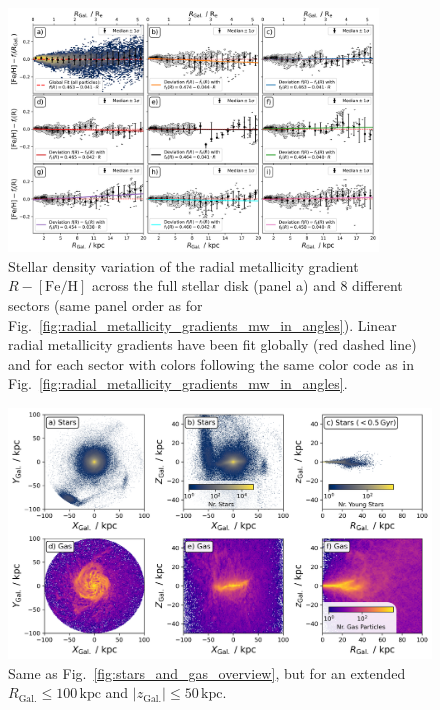 \documentclass[fleqn,usenatbib]{mnras}
\begin{document}
\begin{figure}
    \centering
    \includegraphics[width=0.875\textwidth]{figures/linear_radial_metallicity_gradients_mw_in_angles.png}
    \caption{Stellar density variation of the radial metallicity gradient $R-\mathrm{[Fe/H]}$ across the full stellar disk (panel a) and 8 different sectors (same panel order as for Fig.~\ref{fig:radial_metallicity_gradients_mw_in_angles}). Linear radial metallicity gradients have been fit globally (red dashed line) and for each sector with colors following the same color code as in Fig.~\ref{fig:radial_metallicity_gradients_mw_in_angles}.}    \label{fig:linear_radial_metallicity_gradients_mw_in_angles}
\end{figure}

\begin{figure}
    \centering
    \includegraphics[width=\textwidth]{figures/stars_and_gas_overview_100kpc.png}
    \caption{Same as Fig.~\ref{fig:stars_and_gas_overview}, but for an extended $R_\mathrm{Gal.} \leq 100\,\mathrm{kpc}$ and $\vert z_\mathrm{Gal.} \vert \leq 50\,\mathrm{kpc}$.}
    \label{fig:stars_and_gas_overview_100kpc}
\end{figure}

\bsp	%
\label{lastpage}
\end{document}
